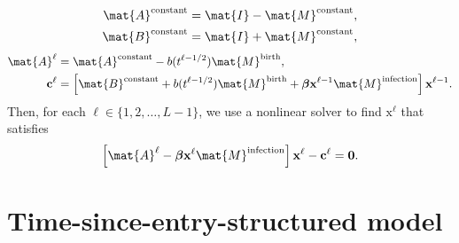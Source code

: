 \documentclass{jpmarticle}
\renewcommand{\vec}[1]{\boldsymbol{\mathrm{#1}}}
\begin{document}
\begin{equation}
  \begin{split}
    \mat{A}^{\text{constant}} &=
    \mat{I}
    - \mat{M}^{\text{constant}},
    \\
    \mat{B}^{\text{constant}} &=
    \mat{I}
    + \mat{M}^{\text{constant}},
  \end{split}
\end{equation}
\begin{equation}
  \begin{split}
    \mat{A}^{\ell} &=
    \mat{A}^{\text{constant}}
    - b(t^{\ell - 1 / 2}) \mat{M}^{\text{birth}},
    \\
    \vec{c}^{\ell} &=
    \left[
      \mat{B}^{\text{constant}}
      + b(t^{\ell - 1 / 2}) \mat{M}^{\text{birth}}
      + \vec{\beta} \vec{x}^{\ell - 1} \mat{M}^{\text{infection}}
    \right] \vec{x}^{\ell - 1}.
  \end{split}
\end{equation}
Then, for each $\ell \in \{1, 2, \ldots, L - 1\}$,
we use a nonlinear solver to find $\vec{x}^{\ell}$ that satisfies
\begin{equation}
  \left[
    \mat{A}^{\ell}
    - \vec{\beta} \vec{x}^{\ell} \mat{M}^{\text{infection}}
  \right] \vec{x}^{\ell}
  - \vec{c}^{\ell}
  = \vec{0}.
\end{equation}


\section{Time-since-entry-structured model}
\end{document}
